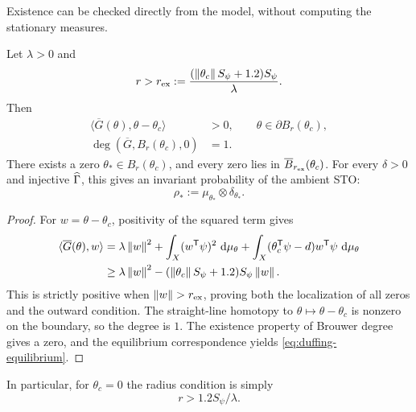 Existence can be checked directly from the model, without computing
the stationary measures.

\begin{proposition}
\label{prop:duffing-constructive-existence}
Let $\lambda>0$ and
\begin{equation}
  r>r_{\rm ex}:=\frac{(\left\lVert \theta_c\right\rVert S_\psi+1.2)S_\psi}{\lambda}.
  \label{eq:duffing-explicit-existence-radius}
\end{equation}
Then
\begin{align}
  \langle\overline G(\theta),\theta-\theta_c\rangle&>0,
    \qquad \theta\in\partial B_r(\theta_c),
  \label{eq:duffing-explicit-outward}\\
  \deg(\overline G,B_r(\theta_c),0)&=1.
  \label{eq:duffing-explicit-degree}
\end{align}
There exists a zero $\theta_*\in B_r(\theta_c)$, and every zero lies in
$\overline B_{r_{\rm ex}}(\theta_c)$. For every $\delta>0$ and injective
$\widehat{\Gamma}$, this gives an invariant probability of the ambient STO:
\begin{equation}
  \rho_*:=\mu_{\theta_*}\otimes\delta_{\theta_*}.
  \label{eq:duffing-equilibrium}
\end{equation}
\end{proposition}

\begin{proof}
For $w=\theta-\theta_c$, positivity of the squared term gives
\begin{equation}
\begin{aligned}
  \langle\overline G(\theta),w\rangle
  &=\lambda\left\lVert w\right\rVert^2+\int_X(w^{\mathsf T}\psi)^2\,\,\mathrm{d}\mu_\theta
    +\int_X(\theta_c^{\mathsf T}\psi-d)w^{\mathsf T}\psi\,\,\mathrm{d}\mu_\theta\\
  &\ge\lambda\left\lVert w\right\rVert^2-(\left\lVert \theta_c\right\rVert S_\psi+1.2)S_\psi\left\lVert w\right\rVert.
\end{aligned}
  \label{eq:duffing-radial-coercivity}
\end{equation}
This is strictly positive when $\left\lVert w\right\rVert>r_{\rm ex}$, proving both
the localization of all zeros and the outward condition. The straight-line
homotopy to $\theta\mapsto\theta-\theta_c$ is nonzero on the boundary,
so the degree is $1$. The existence property of Brouwer degree gives a zero,
and the equilibrium correspondence yields \eqref{eq:duffing-equilibrium}.
\end{proof}

In particular, for $\theta_c=0$ the radius condition is simply
\begin{equation}
  r>1.2S_\psi/\lambda.
  \label{eq:duffing-zero-anchor-radius}
\end{equation}

